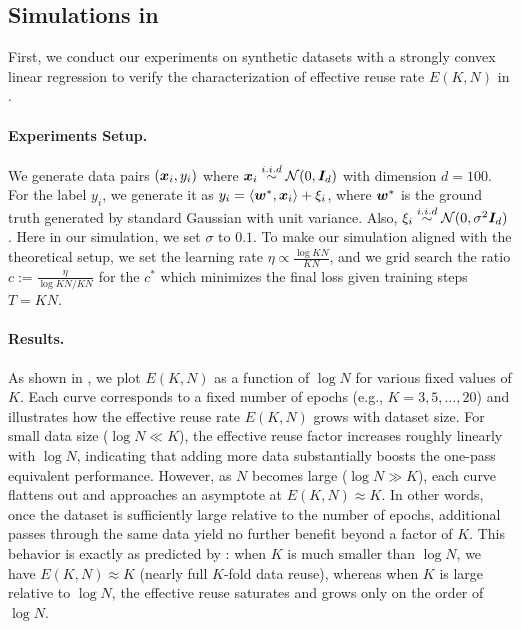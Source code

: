 \subsection{Simulations in }

First, we conduct our experiments on synthetic datasets with a strongly convex linear regression to verify the characterization of effective reuse rate $E(K,N)$ in .

\paragraph{Experiments Setup.}  We generate data pairs $({\bm{x}}_i,y_i)$ where ${\bm{x}}_i \overset{i.i.d}{\sim}{\mathcal{N}}(0,{\bm{I}}_d)$ with dimension $d = 100$. For the label $y_i$, we generate it as $y_i = \left\langle {\bm{w}}^*,{\bm{x}}_i\right\rangle + \xi_i$, where ${\bm{w}}^*$ is the ground truth generated by standard Gaussian with unit variance.
Also, $\xi_i\overset{i.i.d}{\sim}{\mathcal{N}}(0,\sigma^2{\bm{I}}_d)$. Here in our simulation, we set $\sigma$ to $0.1$. To make our simulation aligned with the theoretical setup, we set the learning rate $\eta \propto \frac{\log KN}{KN}$, and we grid search the ratio $c:=\frac{\eta}{\log KN/KN}$ for the $c^*$ which minimizes the final loss given training steps $T=KN$. 

\paragraph{Results.} As shown in , we plot $E(K,N)$ as a function of $\log N$ for various fixed values of $K$. Each curve corresponds to a fixed number of epochs (e.g., $K=3,5,\dots,20$) and illustrates how the effective reuse rate $E(K,N)$ grows with dataset size. For small data size ($\log N \ll K$), the effective reuse factor increases roughly linearly with $\log N$, indicating that adding more data substantially boosts the one-pass equivalent performance. However, as $N$ becomes large ($\log N \gg K$), each curve flattens out and approaches an asymptote at $E(K,N)\approx K$. In other words, once the dataset is sufficiently large relative to the number of epochs, additional passes through the same data yield no further benefit beyond a factor of $K$. This behavior is exactly as predicted by : when $K$ is much smaller than $\log N$, we have $E(K,N)\approx K$ (nearly full $K$-fold data reuse), whereas when $K$ is large relative to $\log N$, the effective reuse saturates and grows only on the order of $\log N$.

